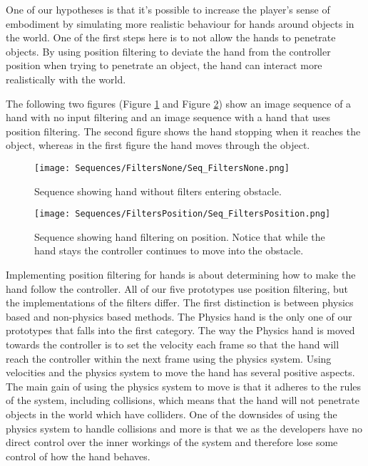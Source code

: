 One of our hypotheses is that it's possible to increase the player's sense of embodiment by simulating more realistic behaviour for hands around objects in the world. One of the first steps here is to not allow the hands to penetrate objects. By using position filtering to deviate the hand from the controller position when trying to penetrate an object, the hand can interact more realistically with the world.

The following two figures (Figure \ref{fig:filtersNone} and Figure \ref{fig:filtersPosition}) show an image sequence of a hand with no input filtering and an image sequence with a hand that uses position filtering. The second figure shows the hand stopping when it reaches the object, whereas in the first figure the hand moves through the object.

\begin{figure}[H]
\centering
\texttt{[image: Sequences/FiltersNone/Seq\_FiltersNone.png]}
\caption{Sequence showing hand without filters entering obstacle.}
\label{fig:filtersNone}
\end{figure}

\begin{figure}[H]
\centering
\texttt{[image: Sequences/FiltersPosition/Seq\_FiltersPosition.png]}
\caption{Sequence showing hand filtering on position. Notice that while the hand stays the controller continues to move into the obstacle.}
\label{fig:filtersPosition}
\end{figure}

Implementing position filtering for hands is about determining how to make the hand follow the controller. All of our five prototypes use position filtering, but the implementations of the filters differ. The first distinction is between physics based and non-physics based methods. The Physics hand is the only one of our prototypes that falls into the first category. The way the Physics hand is moved towards the controller is to set the velocity each frame so that the hand will reach the controller within the next frame using the physics system. Using velocities and the physics system to move the hand has several positive aspects. The main gain of using the physics system to move is that it adheres to the rules of the system, including collisions, which means that the hand will not penetrate objects in the world which have colliders. One of the downsides of using the physics system to handle collisions and more is that we as the developers have no direct control over the inner workings of the system and therefore lose some control of how the hand behaves.

